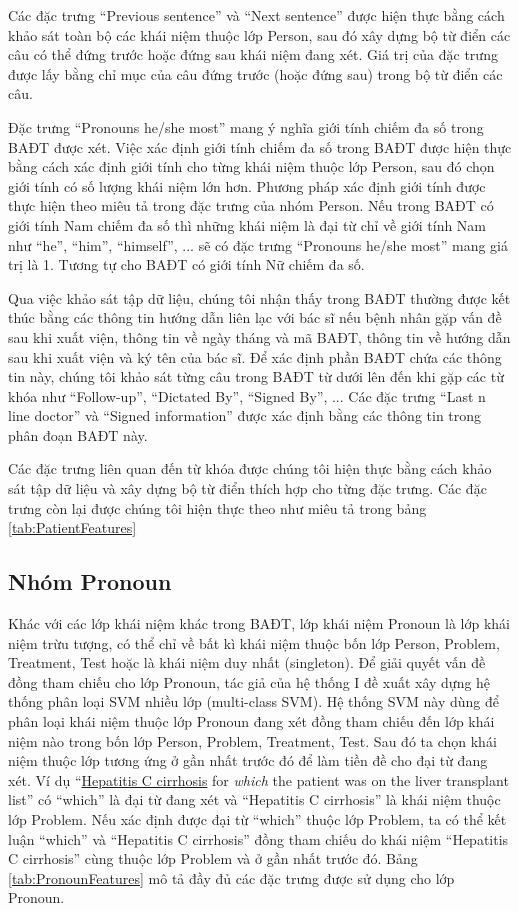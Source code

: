 Các đặc trưng ``Previous sentence'' và ``Next sentence'' được hiện thực bằng cách khảo sát toàn bộ các khái niệm thuộc lớp Person, sau đó xây dựng bộ từ điển các câu có thể đứng trước hoặc đứng sau khái niệm đang xét. Giá trị của đặc trưng được lấy bằng chỉ mục của câu đứng trước (hoặc đứng sau) trong bộ từ điển các câu.

Đặc trưng ``Pronouns he/she most'' mang ý nghĩa giới tính chiếm đa số trong BAĐT được xét. Việc xác định giới tính chiếm đa số trong BAĐT được hiện thực bằng cách xác định giới tính cho từng khái niệm thuộc lớp Person, sau đó chọn giới tính có số lượng khái niệm lớn hơn. Phương pháp xác định giới tính được thực hiện theo miêu tả trong đặc trưng của nhóm Person. Nếu trong BAĐT có giới tính Nam chiếm đa số thì những khái niệm là đại từ chỉ về giới tính Nam như ``he'', ``him'', ``himself'', ... sẽ có đặc trưng ``Pronouns he/she most'' mang giá trị là 1. Tương tự cho BAĐT có giới tính Nữ chiếm đa số.

Qua việc khảo sát tập dữ liệu, chúng tôi nhận thấy trong BAĐT thường được kết thúc bằng các thông tin hướng dẫn liên lạc với bác sĩ nếu bệnh nhân gặp vấn đề sau khi xuất viện, thông tin về ngày tháng và mã BAĐT, thông tin về hướng dẫn sau khi xuất viện và ký tên của bác sĩ. Để xác định phần BAĐT chứa các thông tin này, chúng tôi khảo sát từng câu trong BAĐT từ dưới lên đến khi gặp các từ khóa như ``Follow-up'', ``Dictated By'', ``Signed By'', ... Các đặc trưng ``Last n line doctor'' và ``Signed information'' được xác định bằng các thông tin trong phân đoạn BAĐT này.

Các đặc trưng liên quan đến từ khóa được chúng tôi hiện thực bằng cách khảo sát tập dữ liệu và xây dựng bộ từ điển thích hợp cho từng đặc trưng. Các đặc trưng còn lại được chúng tôi hiện thực theo như miêu tả trong bảng \ref{tab:PatientFeatures}

\subsection*{Nhóm Pronoun}
Khác với các lớp khái niệm khác trong BAĐT, lớp khái niệm Pronoun là lớp khái niệm trừu tượng, có thể chỉ về bất kì khái niệm thuộc bốn lớp Person, Problem, Treatment, Test hoặc là khái niệm duy nhất (singleton). Để giải quyết vấn đề đồng tham chiếu cho lớp Pronoun, tác giả của hệ thống I đề xuất xây dựng hệ thống phân loại SVM nhiều lớp (multi-class SVM). Hệ thống SVM này dùng để phân loại khái niệm thuộc lớp Pronoun đang xét đồng tham chiếu đến lớp khái niệm nào trong bốn lớp Person, Problem, Treatment, Test. Sau đó ta chọn khái niệm thuộc lớp tương ứng ở gần nhất trước đó để làm tiền đề cho đại từ đang xét. Ví dụ ``\underline{Hepatitis C cirrhosis} for \textit{which} the patient was on the liver transplant list'' có ``which'' là đại từ đang xét và ``Hepatitis C cirrhosis'' là khái niệm thuộc lớp Problem. Nếu xác định được đại từ ``which'' thuộc lớp Problem, ta có thể kết luận ``which'' và ``Hepatitis C cirrhosis'' đồng tham chiếu do khái niệm ``Hepatitis C cirrhosis'' cùng thuộc lớp Problem và ở gần nhất trước đó. Bảng \ref{tab:PronounFeatures} mô tả đầy đủ các đặc trưng được sử dụng cho lớp Pronoun.


